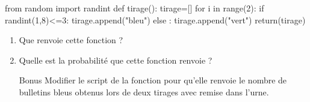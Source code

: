 \documentclass[a4paper,11pt]{article}
\begin{document}
\begin{envpython}[12cm]
	from random import randint
	def tirage():
		tirage=[]
		for i in range(2):
			if randint(1,8)<=3:
				tirage.append("bleu")
			else :
				tirage.append("vert")
		return(tirage)
\end{envpython}

\begin{enumerate}
	\item Que renvoie cette fonction ?
	\item Quelle est la probabilité que cette fonction renvoie  ?
	\item[Bonus] Modifier le script de la fonction  pour qu’elle renvoie le nombre de bulletins bleus obtenus lors de deux tirages avec remise dans l’urne.
\end{enumerate}
\end{document}
